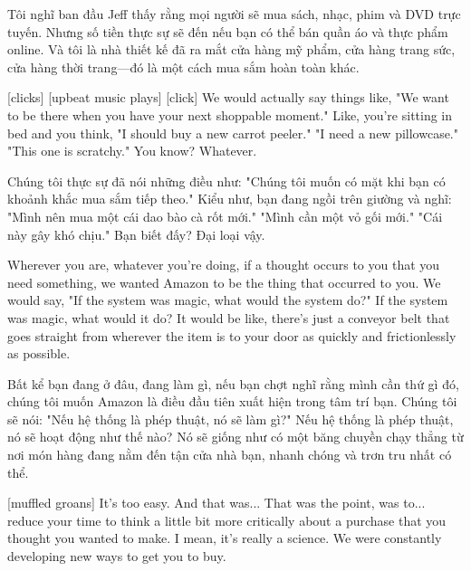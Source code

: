 \documentclass[a4paper]{article}
\begin{document}
	\begin{vietnamese-v2}
		 Tôi nghĩ ban đầu Jeff thấy rằng mọi người sẽ mua sách, nhạc, phim và DVD trực tuyến. 
		Nhưng số tiền thực sự sẽ đến nếu bạn có thể bán quần áo và thực phẩm online. 
		Và tôi là nhà thiết kế đã ra mắt cửa hàng mỹ phẩm, cửa hàng trang sức, cửa hàng thời trang—đó là một cách mua sắm hoàn toàn khác.
	\end{vietnamese-v2}
	
	[clicks]
	[upbeat music plays]
	[click]
	We would actually say things like, "We want to be there when you have your next shoppable moment."
	Like, you're sitting in bed and you think, "I should buy a new carrot peeler."
	"I need a new pillowcase."
	"This one is scratchy." You know? Whatever.
	
	\begin{vietnamese-v2}
		Chúng tôi thực sự đã nói những điều như: "Chúng tôi muốn có mặt khi bạn có khoảnh khắc mua sắm tiếp theo." 
		Kiểu như, bạn đang ngồi trên giường và nghĩ: "Mình nên mua một cái dao bào cà rốt mới." 
		"Mình cần một vỏ gối mới." 
		"Cái này gây khó chịu." Bạn biết đấy? Đại loại vậy.
	\end{vietnamese-v2}
	
	Wherever you are, whatever you're doing, if a thought occurs to you that you need something, we wanted Amazon to be the thing that occurred to you.
	We would say, "If the system was magic, what would the system do?"
	If the system was magic, what would it do? It would be like, there's just a conveyor belt that goes straight from wherever the item is to your door as quickly and frictionlessly as possible.
	
	
	\begin{vietnamese-v2}
		Bất kể bạn đang ở đâu, đang làm gì, nếu bạn chợt nghĩ rằng mình cần thứ gì đó, chúng tôi muốn Amazon là điều đầu tiên xuất hiện trong tâm trí bạn. Chúng tôi sẽ nói: "Nếu hệ thống là phép thuật, nó sẽ làm gì?" 
		Nếu hệ thống là phép thuật, nó sẽ hoạt động như thế nào? Nó sẽ giống như có một băng chuyền chạy thẳng từ nơi món hàng đang nằm đến tận cửa nhà bạn, nhanh chóng và trơn tru nhất có thể.
	\end{vietnamese-v2}
	
	[muffled groans]
	It's too easy. And that was... That was the point, was to... reduce your time to think a little bit more critically about a purchase that you thought you wanted to make.
	I mean, it's really a science.
	We were constantly developing new ways to get you to buy.
	
\end{document}
